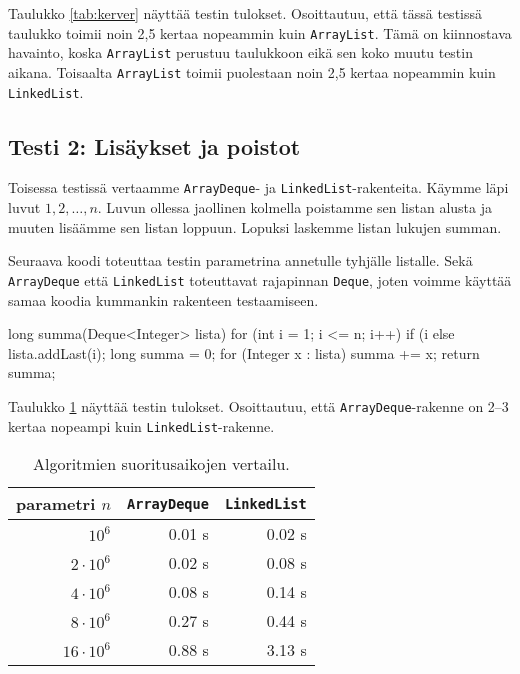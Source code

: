 Taulukko \ref{tab:kerver} näyttää testin tulokset.
Osoittautuu, että tässä testissä taulukko toimii noin
2,5 kertaa nopeammin kuin \texttt{ArrayList}.
Tämä on kiinnostava havainto, koska \texttt{ArrayList}
perustuu taulukkoon eikä sen koko muutu testin aikana.
Toisaalta \texttt{ArrayList} toimii puolestaan noin
2,5 kertaa nopeammin kuin \texttt{LinkedList}.

\subsection{Testi 2: Lisäykset ja poistot}

Toisessa testissä vertaamme \texttt{ArrayDeque}- ja \texttt{LinkedList}-rakenteita.
Käymme läpi luvut $1,2,\dots,n$.
Luvun ollessa jaollinen kolmella poistamme sen listan alusta
ja muuten lisäämme sen listan loppuun.
Lopuksi laskemme listan lukujen summan.

Seuraava koodi toteuttaa testin parametrina annetulle tyhjälle listalle.
Sekä \texttt{ArrayDeque} että \texttt{LinkedList} toteuttavat
rajapinnan \texttt{Deque}, joten voimme käyttää samaa koodia
kummankin rakenteen testaamiseen.

\begin{code}
long summa(Deque<Integer> lista) {
    for (int i = 1; i <= n; i++) {
        if (i%
        else lista.addLast(i);
    }
    long summa = 0;
    for (Integer x : lista) summa += x;
    return summa;
}
\end{code}

Taulukko \ref{tab:lispoi} näyttää testin tulokset.
Osoittautuu, että \texttt{ArrayDeque}-raken\-ne on
2–3 kertaa nopeampi kuin \texttt{LinkedList}-rakenne.

\begin{table}
\center
\begin{tabular}{rrr}
parametri $n$ & \texttt{ArrayDeque} & \texttt{LinkedList} \\
\hline
$10^6$ & 0.01 s & 0.02 s \\
$2 \cdot 10^6$ & 0.02 s & 0.08 s \\
$4 \cdot 10^6$ & 0.08 s & 0.14 s \\
$8 \cdot 10^6$ & 0.27 s & 0.44 s \\
$16 \cdot 10^6$ & 0.88 s & 3.13 s \\
\end{tabular}
\caption{Algoritmien suoritusaikojen vertailu.}
\label{tab:lispoi}
\end{table}


